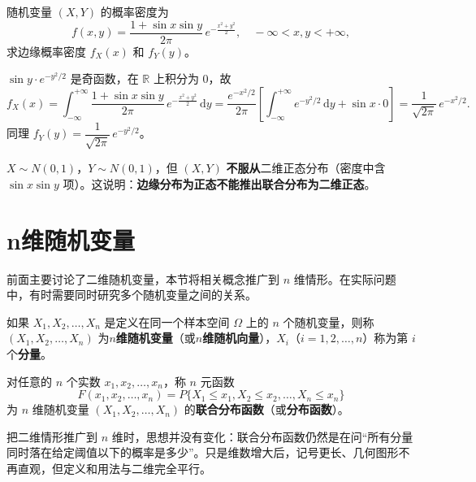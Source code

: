 ﻿\documentclass[lang=cn,11pt]{elegantbook}
\begin{document}
\begin{exercise}[边缘密度不保证联合为正态] \label{exer:3-c5}
随机变量 $(X,Y)$ 的概率密度为
\[
f(x,y) = \frac{1+\sin x\sin y}{2\pi}\,e^{-\frac{x^2+y^2}{2}}, \quad -\infty < x, y < +\infty,
\]
求边缘概率密度 $f_X(x)$ 和 $f_Y(y)$。
\end{exercise}
\begin{solution}
$\sin y \cdot e^{-y^2/2}$ 是奇函数，在 $\mathbb{R}$ 上积分为 $0$，故
\[
f_X(x) = \int_{-\infty}^{+\infty}\frac{1+\sin x\sin y}{2\pi}\,e^{-\frac{x^2+y^2}{2}}\,\mathrm{d}y = \frac{e^{-x^2/2}}{2\pi}\left[\int_{-\infty}^{+\infty}e^{-y^2/2}\,\mathrm{d}y + \sin x \cdot 0\right] = \frac{1}{\sqrt{2\pi}}\,e^{-x^2/2}.
\]
同理 $f_Y(y) = \dfrac{1}{\sqrt{2\pi}}\,e^{-y^2/2}$。
\begin{note}
$X \sim N(0,1)$，$Y \sim N(0,1)$，但 $(X,Y)$ \textbf{不服从}二维正态分布（密度中含 $\sin x\sin y$ 项）。这说明：\textbf{边缘分布为正态不能推出联合分布为二维正态}。
\end{note}
\end{solution}


\section{n维随机变量}

前面主要讨论了二维随机变量，本节将相关概念推广到 $n$ 维情形。在实际问题中，有时需要同时研究多个随机变量之间的关系。

\begin{definition}[$n$维随机变量] \label{def:n-d-random-variable}
如果 $X_1, X_2, \dots, X_n$ 是定义在同一个样本空间 $\Omega$ 上的 $n$ 个随机变量，则称 $(X_1, X_2, \dots, X_n)$ 为\textbf{$n$维随机变量}（或\textbf{$n$维随机向量}），$X_i$（$i=1,2,\dots,n$）称为第 $i$ 个\textbf{分量}。
\end{definition}

\begin{definition}[$n$维联合分布函数] \label{def:n-joint-df}
对任意的 $n$ 个实数 $x_1, x_2, \dots, x_n$，称 $n$ 元函数
\[
F(x_1, x_2, \dots, x_n) = P\{X_1 \leqslant x_1, X_2 \leqslant x_2, \dots, X_n \leqslant x_n\}
\]
为 $n$ 维随机变量 $(X_1, X_2, \dots, X_n)$ 的\textbf{联合分布函数}（或\textbf{分布函数}）。
\end{definition}

\begin{note}
把二维情形推广到 $n$ 维时，思想并没有变化：联合分布函数仍然是在问“所有分量同时落在给定阈值以下的概率是多少”。只是维数增大后，记号更长、几何图形不再直观，但定义和用法与二维完全平行。
\end{note}
\end{document}
